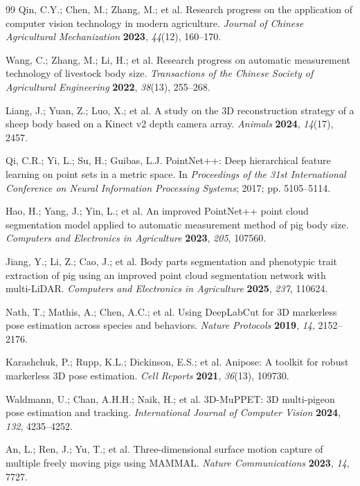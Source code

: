 \documentclass[computers,article,submit,pdftex,moreauthors]{mdpi}
\begin{document}
\begin{thebibliography}{99}
 Qin, C.Y.; Chen, M.; Zhang, M.; et al. Research progress on the application of computer vision technology in modern agriculture. \textit{Journal of Chinese Agricultural Mechanization} \textbf{2023}, \textit{44}(12), 160--170.

 Wang, C.; Zhang, M.; Li, H.; et al. Research progress on automatic measurement technology of livestock body size. \textit{Transactions of the Chinese Society of Agricultural Engineering} \textbf{2022}, \textit{38}(13), 255--268.

 Liang, J.; Yuan, Z.; Luo, X.; et al. A study on the 3D reconstruction strategy of a sheep body based on a Kinect v2 depth camera array. \textit{Animals} \textbf{2024}, \textit{14}(17), 2457.

 Qi, C.R.; Yi, L.; Su, H.; Guibas, L.J. PointNet++: Deep hierarchical feature learning on point sets in a metric space. In \textit{Proceedings of the 31st International Conference on Neural Information Processing Systems}; 2017; pp. 5105--5114.

 Hao, H.; Yang, J.; Yin, L.; et al. An improved PointNet++ point cloud segmentation model applied to automatic measurement method of pig body size. \textit{Computers and Electronics in Agriculture} \textbf{2023}, \textit{205}, 107560.

 Jiang, Y.; Li, Z.; Cao, J.; et al. Body parts segmentation and phenotypic trait extraction of pig using an improved point cloud segmentation network with multi-LiDAR. \textit{Computers and Electronics in Agriculture} \textbf{2025}, \textit{237}, 110624.

 Nath, T.; Mathis, A.; Chen, A.C.; et al. Using DeepLabCut for 3D markerless pose estimation across species and behaviors. \textit{Nature Protocols} \textbf{2019}, \textit{14}, 2152--2176.

 Karashchuk, P.; Rupp, K.L.; Dickinson, E.S.; et al. Anipose: A toolkit for robust markerless 3D pose estimation. \textit{Cell Reports} \textbf{2021}, \textit{36}(13), 109730.

 Waldmann, U.; Chan, A.H.H.; Naik, H.; et al. 3D-MuPPET: 3D multi-pigeon pose estimation and tracking. \textit{International Journal of Computer Vision} \textbf{2024}, \textit{132}, 4235--4252.

 An, L.; Ren, J.; Yu, T.; et al. Three-dimensional surface motion capture of multiple freely moving pigs using MAMMAL. \textit{Nature Communications} \textbf{2023}, \textit{14}, 7727.


\end{thebibliography}
\end{document}
